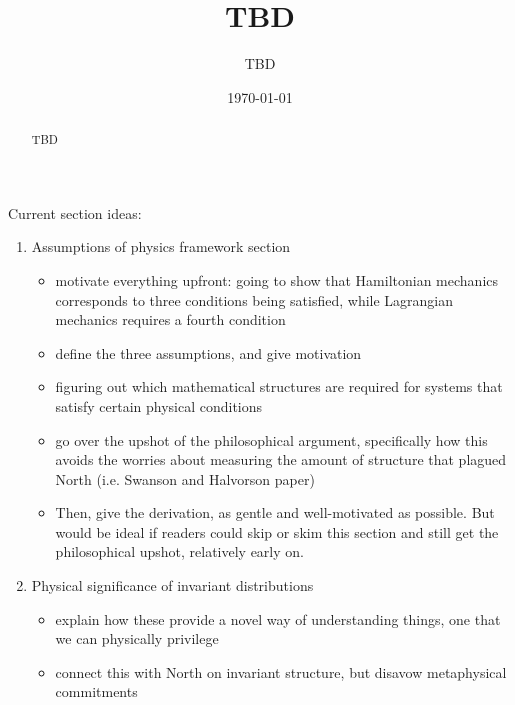 \documentclass[letterpaper]{article}
\begin{document}

\title{TBD}
\author{TBD}

\date{\today}

\maketitle

\begin{abstract}
	TBD
\end{abstract}


Current section ideas:

\begin{enumerate}[1.)]

\item Assumptions of physics framework section

\begin{itemize}

\item motivate everything upfront: going to show that Hamiltonian mechanics corresponds to three conditions being satisfied, while Lagrangian mechanics requires a fourth condition
\item define the three assumptions, and give motivation
\item figuring out which mathematical structures are required for systems that satisfy certain physical conditions
\item go over the upshot of the philosophical argument, specifically how this avoids the worries about measuring the amount of structure that plagued North (i.e. Swanson and Halvorson paper)
\item Then, give the derivation, as gentle and well-motivated as possible. But would be ideal if readers could skip or skim this section and still get the philosophical upshot, relatively early on.

\end{itemize}

\item Physical significance of invariant distributions

\begin{itemize}

\item explain how these provide a novel way of understanding things, one that we can physically privilege

\item connect this with North on invariant structure, but disavow metaphysical commitments



\end{itemize}
\end{enumerate}
\end{document}

